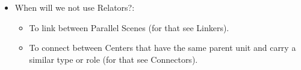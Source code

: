\documentclass[11pt]{article}
\newcommand{\orig}[1]{{\color{red} {#1}}}
\newcommand{\dcom}[1]{\textit{\color{blue}{#1}}}
\begin{document}
\begin{enumerate}
\begin{itemize}
    \item
	When will we not use Relators?: 
    \begin{itemize}
    \item 
    To link between Parallel Scenes (for that see Linkers). 
    \item
    To connect between Centers that have the same parent unit and carry a similar type or role (for that see Connectors). 
    \end{itemize}

\end{itemize}







    
    




\end{enumerate}
\end{document}
